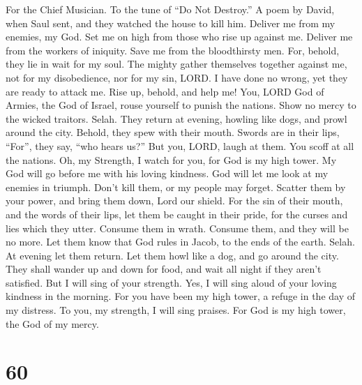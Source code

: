 For the Chief Musician. To the tune of ``Do Not Destroy.'' A poem by
David, when Saul sent, and they watched the house to kill him.
 Deliver me from my enemies, my God. Set me on high from
those who rise up against me.  Deliver me from the workers
of iniquity. Save me from the bloodthirsty men.  For,
behold, they lie in wait for my soul. The mighty gather themselves
together against me, not for my disobedience, nor for my sin, LORD.
 I have done no wrong, yet they are ready to attack me. Rise
up, behold, and help me!  You, LORD God of Armies, the God
of Israel, rouse yourself to punish the nations. Show no mercy to the
wicked traitors. Selah.  They return at evening, howling
like dogs, and prowl around the city.  Behold, they spew
with their mouth. Swords are in their lips, ``For'', they say, ``who
hears us?''  But you, LORD, laugh at them. You scoff at all
the nations.  Oh, my Strength, I watch for you, for God is
my high tower.  My God will go before me with his loving
kindness. God will let me look at my enemies in triumph. 
Don't kill them, or my people may forget. Scatter them by your power,
and bring them down, Lord our shield.  For the sin of their
mouth, and the words of their lips, let them be caught in their pride,
for the curses and lies which they utter.  Consume them in
wrath. Consume them, and they will be no more. Let them know that God
rules in Jacob, to the ends of the earth. Selah.  At
evening let them return. Let them howl like a dog, and go around the
city.  They shall wander up and down for food, and wait all
night if they aren't satisfied.  But I will sing of your
strength. Yes, I will sing aloud of your loving kindness in the morning.
For you have been my high tower, a refuge in the day of my distress.
 To you, my strength, I will sing praises. For God is my
high tower, the God of my mercy.

\hypertarget{section-58}{%
\section{60}\label{section-58}}

